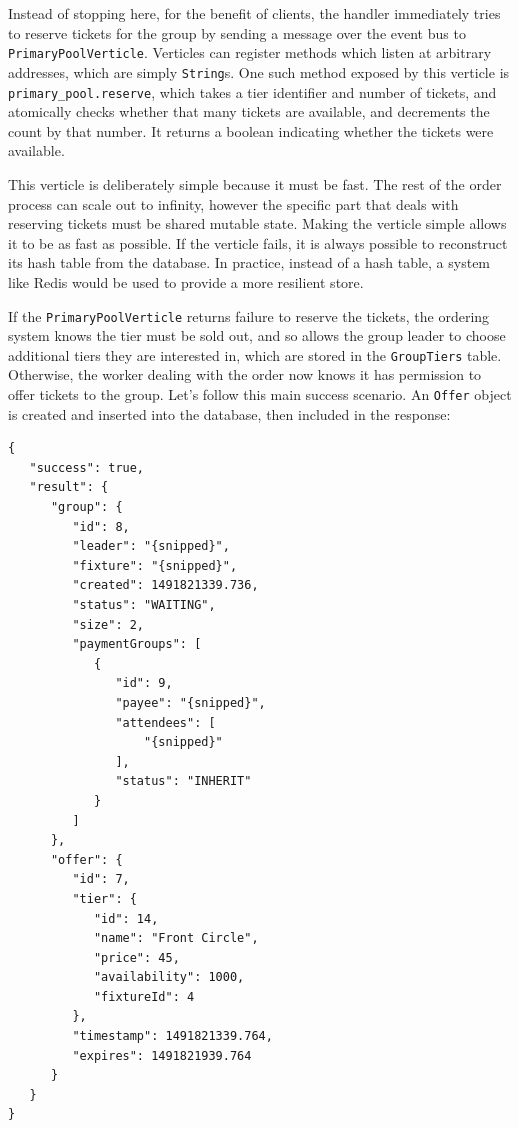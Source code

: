 \documentclass[12pt,a4paper]{bhamdissertation}
\newcommand{\code}[1]{\texttt{#1}}
\begin{document}
Instead of stopping here, for the benefit of clients, the handler immediately tries to reserve tickets for the group by sending a message over the event bus to \code{Primary\-Pool\-Verticle}. Verticles can register methods which listen at arbitrary addresses, which are simply \code{String}s. One such method exposed by this verticle is \code{primary\_pool.\-reserve}, which takes a tier identifier and number of tickets, and atomically checks whether that many tickets are available, and decrements the count by that number. It returns a boolean indicating whether the tickets were available.

This verticle is deliberately simple because it must be fast. The rest of the order process can scale out to infinity, however the specific part that deals with reserving tickets must be shared mutable state. Making the verticle simple allows it to be as fast as possible. If the verticle fails, it is always possible to reconstruct its hash table from the database. In practice, instead of a hash table, a system like Redis would be used to provide a more resilient store.

If the \code{Primary\-Pool\-Verticle} returns failure to reserve the tickets, the ordering system knows the tier must be sold out, and so allows the group leader to choose additional tiers they are interested in, which are stored in the \code{GroupTiers} table. Otherwise, the worker dealing with the order now knows it has permission to offer tickets to the group. Let's follow this main success scenario. An \code{Offer} object is created and inserted into the database, then included in the response:

\begin{verbatim}
{
   "success": true,
   "result": {
      "group": {
         "id": 8,
         "leader": "{snipped}",
         "fixture": "{snipped}",
         "created": 1491821339.736,
         "status": "WAITING",
         "size": 2,
         "paymentGroups": [
            {
               "id": 9,
               "payee": "{snipped}",
               "attendees": [
                   "{snipped}"
               ],
               "status": "INHERIT"
            }
         ]
      },
      "offer": {
         "id": 7,
         "tier": {
            "id": 14,
            "name": "Front Circle",
            "price": 45,
            "availability": 1000,
            "fixtureId": 4
         },
         "timestamp": 1491821339.764,
         "expires": 1491821939.764
      }
   }
}
\end{verbatim}
\end{document}
